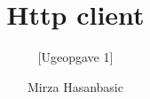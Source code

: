 \documentclass{sig-alternate-05-2015}
\begin{document}




\title{Http client}
\subtitle{[Ugeopgave 1]
\titlenote{}}
%
%
%
%
%

%
\author{
%
%
\alignauthor
Mirza Hasanbasic
}

\end{document}
